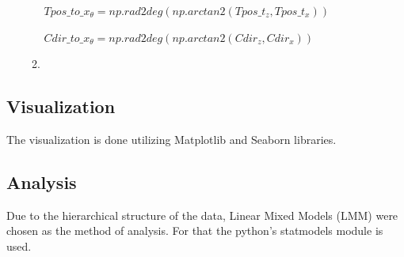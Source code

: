 \begin{enumerate}
\begin{enumerate}
		\begin{center}
			$Tpos\_to\_x_{\theta} = np.rad2deg(np.arctan2(Tpos\_t_{z}, Tpos\_t_{x}))$
		\end{center}
	
		\begin{center}
			$Cdir\_to\_x_{\theta} = np.rad2deg(np.arctan2(Cdir_{z}, Cdir_{x}))$
		\end{center}
		
		\item {}
	\end{enumerate}
\end{enumerate}


\subsection{Visualization}

The visualization is done utilizing Matplotlib \autocite{Hunter:2007} and Seaborn \autocite{Waskom2021} libraries.

\subsection{Analysis}
Due to the hierarchical structure of the data, Linear Mixed Models (LMM) were chosen as the method of analysis. For that the python's statmodels \autocite{seabold2010statsmodels} module is used.


